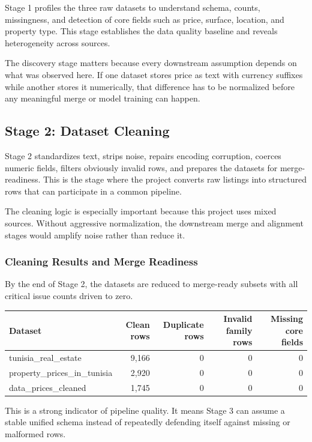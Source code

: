 \documentclass[11pt,a4paper]{article}
\begin{document}
Stage 1 profiles the three raw datasets to understand schema, counts, missingness, and detection of core fields such as price, surface, location, and property type. This stage establishes the data quality baseline and reveals heterogeneity across sources.

The discovery stage matters because every downstream assumption depends on what was observed here. If one dataset stores price as text with currency suffixes while another stores it numerically, that difference has to be normalized before any meaningful merge or model training can happen.

\subsection{Stage 2: Dataset Cleaning}

Stage 2 standardizes text, strips noise, repairs encoding corruption, coerces numeric fields, filters obviously invalid rows, and prepares the datasets for merge-readiness. This is the stage where the project converts raw listings into structured rows that can participate in a common pipeline.

The cleaning logic is especially important because this project uses mixed sources. Without aggressive normalization, the downstream merge and alignment stages would amplify noise rather than reduce it.

\subsubsection{Cleaning Results and Merge Readiness}

By the end of Stage 2, the datasets are reduced to merge-ready subsets with all critical issue counts driven to zero.

\begin{center}
\begin{tabular}{lrrrr}
\toprule
Dataset & Clean rows & Duplicate rows & Invalid family rows & Missing core fields \\
\midrule
tunisia\_real\_estate & 9,166 & 0 & 0 & 0 \\
property\_prices\_in\_tunisia & 2,920 & 0 & 0 & 0 \\
data\_prices\_cleaned & 1,745 & 0 & 0 & 0 \\
\bottomrule
\end{tabular}
\end{center}

This is a strong indicator of pipeline quality. It means Stage 3 can assume a stable unified schema instead of repeatedly defending itself against missing or malformed rows.
\end{document}
